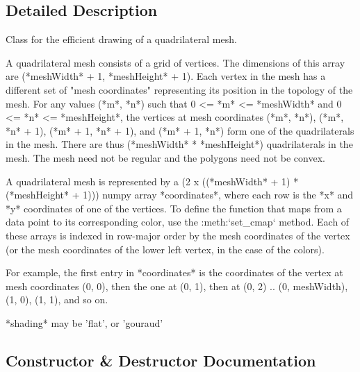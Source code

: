 \subsection{Detailed Description}
\begin{DoxyVerb}Class for the efficient drawing of a quadrilateral mesh.

A quadrilateral mesh consists of a grid of vertices.
The dimensions of this array are (*meshWidth* + 1, *meshHeight* + 1).
Each vertex in the mesh has a different set of "mesh coordinates"
representing its position in the topology of the mesh.
For any values (*m*, *n*) such that 0 <= *m* <= *meshWidth*
and 0 <= *n* <= *meshHeight*, the vertices at mesh coordinates
(*m*, *n*), (*m*, *n* + 1), (*m* + 1, *n* + 1), and (*m* + 1, *n*)
form one of the quadrilaterals in the mesh. There are thus
(*meshWidth* * *meshHeight*) quadrilaterals in the mesh.  The mesh
need not be regular and the polygons need not be convex.

A quadrilateral mesh is represented by a (2 x ((*meshWidth* + 1) *
(*meshHeight* + 1))) numpy array *coordinates*, where each row is
the *x* and *y* coordinates of one of the vertices.  To define the
function that maps from a data point to its corresponding color,
use the :meth:`set_cmap` method.  Each of these arrays is indexed in
row-major order by the mesh coordinates of the vertex (or the mesh
coordinates of the lower left vertex, in the case of the colors).

For example, the first entry in *coordinates* is the coordinates of the
vertex at mesh coordinates (0, 0), then the one at (0, 1), then at (0, 2)
.. (0, meshWidth), (1, 0), (1, 1), and so on.

*shading* may be 'flat', or 'gouraud'
\end{DoxyVerb}
 

\subsection{Constructor \& Destructor Documentation}
\mbox{\label{classmatplotlib_1_1collections_1_1QuadMesh_af624268ac4797e8905f15b343fbadf84}} 
